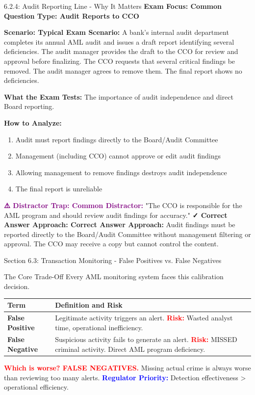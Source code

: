 \documentclass[11pt,a4paper]{beamer}
\newcommand{\redflag}[1]{\textcolor{red}{\textbf{#1}}}
\newcommand{\bluenote}[1]{\textcolor{blue}{\textbf{#1}}}
\newcommand{\examfocus}[1]{\textcolor{orange!80!black}{\textbf{Exam Focus: #1}}}
\newcommand{\trap}[1]{\textcolor{purple}{\textbf{⚠️ Distractor Trap: #1}}}
\newcommand{\correct}[1]{\textcolor{green!50!black}{\textbf{✓ Correct Answer Approach: #1}}}
\newcommand{\scenario}[1]{\textcolor{blue!70!black}{\textbf{Scenario: #1}}}
\begin{document}
	\begin{frame}{6.2.4: Audit Reporting Line - Why It Matters}
		\examfocus{Common Question Type: Audit Reports to CCO}
		
		\scenario{Typical Exam Scenario:}
		A bank's internal audit department completes its annual AML audit and issues a draft report identifying several deficiencies. The audit manager provides the draft to the CCO for review and approval before finalizing. The CCO requests that several critical findings be removed. The audit manager agrees to remove them. The final report shows no deficiencies.
		
		\textbf{What the Exam Tests:} The importance of audit independence and direct Board reporting.
		
		\textbf{How to Analyze:}
		\begin{enumerate}
			\item Audit must report findings directly to the Board/Audit Committee
			\item Management (including CCO) cannot approve or edit audit findings
			\item Allowing management to remove findings destroys audit independence
			\item The final report is unreliable
		\end{enumerate}
		
		\trap{Common Distractor:} "The CCO is responsible for the AML program and should review audit findings for accuracy."
		\correct{Correct Answer Approach:} Audit findings must be reported directly to the Board/Audit Committee without management filtering or approval. The CCO may receive a copy but cannot control the content.
	\end{frame}
	
	
	\begin{frame}{Section 6.3: Transaction Monitoring - False Positives vs. False Negatives}
		\begin{block}{The Core Trade-Off}
			Every AML monitoring system faces this calibration decision.
		\end{block}
		\begin{tabular}{p{}|p{}}
			\hline
			\rowcolor{lightgray}
			\textbf{Term} & \textbf{Definition and Risk} \\
			\hline
			\textbf{False Positive} & Legitimate activity triggers an alert. \redflag{Risk:} Wasted analyst time, operational inefficiency. \\
			\hline
			\textbf{False Negative} & Suspicious activity fails to generate an alert. \redflag{Risk:} MISSED criminal activity. Direct AML program deficiency. \\
			\hline
		\end{tabular}
		\vspace{0.3cm}
		\redflag{Which is worse? FALSE NEGATIVES.} Missing actual crime is always worse than reviewing too many alerts.
		\bluenote{Regulator Priority:} Detection effectiveness > operational efficiency.
	\end{frame}
	
\end{document}
